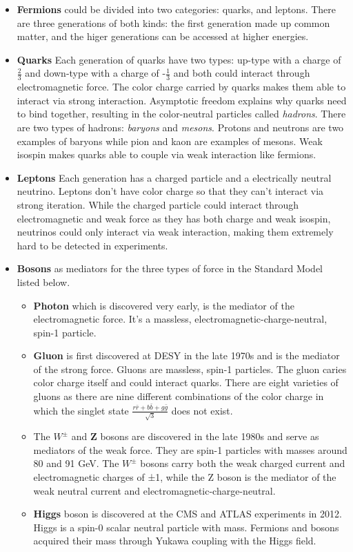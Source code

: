 \begin{itemize}
  \item \textbf{Fermions} could be divided into two categories: quarks, and leptons. There are three generations of both kinds: the first generation made up common matter, and the higer generations can be accessed at higher energies.
  \item \textbf{Quarks} Each generation of quarks have two types: up-type with a charge of $\frac{2}{3}$ and down-type with a charge of -$\frac{1}{3}$ and both could interact through electromagnetic force. The color charge carried by quarks makes them able to 
interact via strong interaction. Asymptotic freedom explains why quarks need to bind together, resulting in the color-neutral particles called \textit{hadrons}. There are two types of hadrons: \textit{baryons} and \textit{mesons}. Protons and neutrons are two examples of baryons while pion and kaon are examples of mesons. Weak isospin makes quarks able to couple via weak interaction like fermions.
  \item \textbf{Leptons} Each generation has a charged particle and a electrically neutral neutrino. Leptons don't have color charge so that they can't interact via strong iteration. While the charged particle could interact through electromagnetic and weak force as they has both charge and weak isospin, neutrinos could only interact via weak interaction, making them extremely hard to be detected in experiments.
  \item \textbf{Bosons} as mediators for the three types of force in the Standard Model listed below.
\begin{itemize}
  \item \textbf{Photon} which is discovered very early, is the mediator of the electromagnetic force. It's a massless, electromagnetic-charge-neutral, spin-1 particle.
  \item \textbf{Gluon} is first discovered at DESY in the late 1970s and is the mediator of the strong force. Gluons are massless, spin-1 particles. The gluon caries color charge itself and could interact quarks. There are eight varieties of gluons as there are nine different combinations of the color charge in which the singlet state $\frac{r\bar{r}+b\bar{b}+g\bar{g}}{\sqrt{3}}$ does not exist.

  \item The \textbf{$W^{\pm}$} and \textbf{Z} bosons are discovered in the late 1980s and serve as mediators of the weak force. They are spin-1 particles with masses around 80 and 91 GeV. The \textbf{$W^{\pm}$} bosons carry both the weak charged current and electromagnetic charges of ±1, while the Z boson is the mediator of the weak neutral current and electromagnetic-charge-neutral. 
    \item \textbf{Higgs} boson is discovered at the CMS and ATLAS experiments in 2012. Higgs is a spin-0 scalar neutral particle with mass. Fermions and bosons acquired their mass through Yukawa coupling with the Higgs field. 
\end{itemize}
\end{itemize}
 
